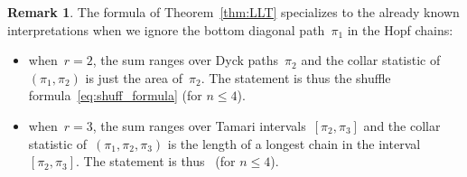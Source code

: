 \documentclass{amsart}
\theoremstyle{definition}
\newtheorem{remark}[theorem]{Remark}
\begin{document}
\begin{remark}
The formula of Theorem~\ref{thm:LLT} specializes to the already known interpretations when we ignore the bottom diagonal path~$\pi_1$ in the Hopf chains:
\begin{itemize}
\item when~$r = 2$, the sum ranges over Dyck paths~$\pi_2$ and the collar statistic of~$(\pi_1, \pi_2)$ is just the area of~$\pi_2$. The statement is thus the shuffle formula~\eqref{eq:shuff_formula} (for $n \le 4$).
\item when~$r = 3$, the sum ranges over Tamari intervals~$[\pi_2, \pi_3]$ and the collar statistic of~$(\pi_1, \pi_2, \pi_3)$ is the length of a longest chain in the interval~$[\pi_2, \pi_3]$. The statement is thus~\cite[Conj.~1]{BergeronPrevilleRatelle} (for $n \le 4$).
\end{itemize}
\end{remark}
\end{document}
